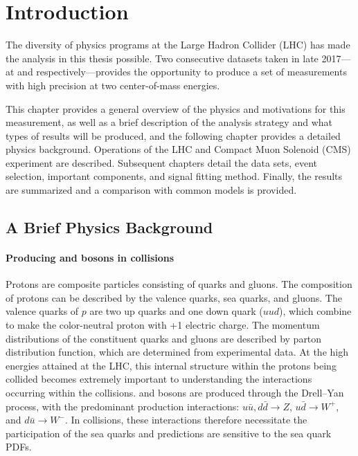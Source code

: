 \chapter{Introduction}

The diversity of physics programs at the Large Hadron Collider (LHC) has made the analysis in this thesis possible. Two consecutive datasets taken in late 2017---at \sg and \sh respectively---provides the opportunity to produce a set of measurements with high precision at two center-of-mass energies.

This chapter provides a general overview of the physics and motivations for this measurement, as well as a brief description of the analysis strategy and what types of results will be produced, and the following chapter provides a detailed physics background. Operations of the LHC and Compact Muon Solenoid (CMS) experiment are described. Subsequent chapters detail the data sets, event selection, important components, and signal fitting method. Finally, the results are summarized and a comparison with common models is provided.


\section{A Brief Physics Background}

\subsubsection{Producing \W and \Z bosons in \pp collisions}
Protons are composite particles consisting of quarks and gluons. The composition of protons can be described by the valence quarks, sea quarks, and gluons. The valence quarks of $p$ are two up quarks and one down quark ($uud$), which combine to make the color-neutral proton with +1 electric charge. The momentum distributions of the constituent quarks and gluons are described by parton distribution function, which are determined from experimental data. At the high energies attained at the LHC, this internal structure within the protons being collided becomes extremely important to understanding the interactions occurring within the \pp collisions. \W and \Z bosons are produced through the Drell--Yan process, with the predominant production interactions: $u\bar{u}, d\bar{d}\rightarrow Z$,  $u\bar{d}\rightarrow W^+$,  and $d\bar{u}\rightarrow W^-$. In \pp collisions, these interactions therefore necessitate the participation of the sea quarks and predictions are sensitive to the sea quark PDFs.


